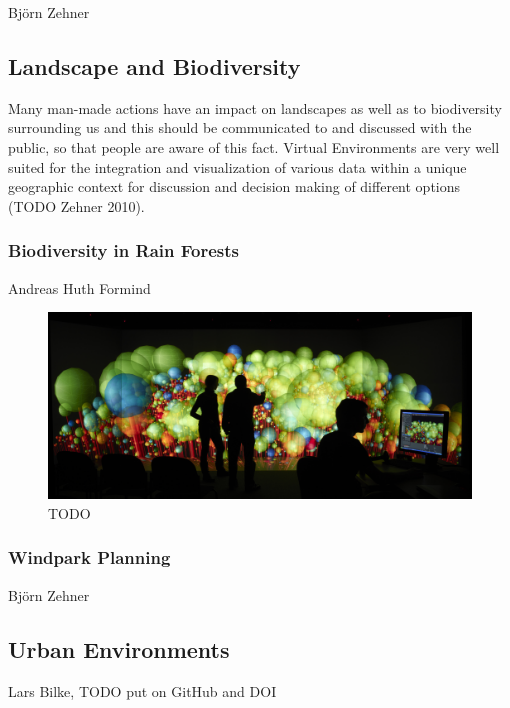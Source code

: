 Bj\"orn Zehner

\subsection{Landscape and Biodiversity}
\label{landscape-and-biodiversity}

Many man-made actions have an impact on landscapes as well as to
biodiversity surrounding us and this should be communicated to and
discussed with the public, so that people are aware of this fact.
Virtual Environments are very well suited for the integration and
visualization of various data within a unique geographic context for
discussion and decision making of different options (TODO Zehner 2010).

\subsubsection{Biodiversity in Rain Forests}
\label{biodiversity-in-rain-forests}

Andreas Huth Formind \cite{kohler:98}

\begin{figure}
  \includegraphics[width=\linewidth]{images/biodiversity.jpg}
\caption{TODO}
\label{fig:biodiversity}
\end{figure}

\subsubsection{Windpark Planning}
\label{windpark-planning}

Bj\"orn Zehner

\subsection{Urban Environments}
\label{urban-environments}

Lars Bilke, TODO put on GitHub and DOI

